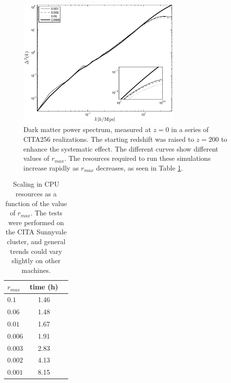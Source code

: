 \documentclass[useAMS,usenatbib]{mn2e}
\begin{document}
\begin{figure}%
  \begin{center}
    \includegraphics[width=3.2in]{graphs/power_ra_max.eps}
  \caption{Dark matter power spectrum, measured at $z=0$ in a series of CITA256 realizations. 
 The starting redshift was raised to $z=200$ to enhance the systematic effect. The different curves show different values of $r_{max}$. 
  The resources required to run these simulations increase rapidly as $r_{max}$ decreases, as seen in Table \ref{table:ra_max}.    \label{fig:ra_max}}
\end{center}
\end{figure}

\begin{table}
\begin{center}
\caption{Scaling in {\small CPU} resources as a function of the value of $r_{max}$. The tests were performed 
on the CITA Sunnyvale cluster, and general trends could vary slightly on other machines.}
\begin{tabular}{|l|c|c|}
\hline 
$r_{max}$         & time (h)   \\                 
\hline
 $0.1$ & 1.46 \\
 $0.06$ & 1.48\\
 $0.01$ & 1.67 \\
 $0.006$ & 1.91\\
 $0.003$ & 2.83 \\
 $0.002$ & 4.13\\
 $0.001$ & 8.15\\
\hline
\end{tabular}
\label{table:ra_max}
\end{center}
\end{table}



%
\end{document}
